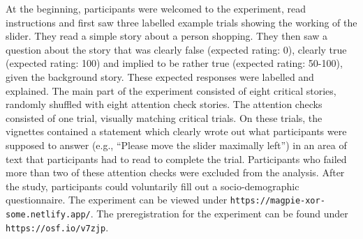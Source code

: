 \documentclass{sp}
\begin{document}
At the beginning, participants were welcomed to the experiment, read instructions and first saw three labelled example trials showing the working of the slider. They read a simple story about a person shopping. They then saw a question about the story that was clearly false (expected rating: 0), clearly true (expected rating: 100) and implied to be rather true (expected rating: 50-100), given the background story. These expected responses were labelled and explained.  
The main part of the experiment consisted of eight critical stories, randomly shuffled with eight attention check stories. The attention checks consisted of one trial, visually matching critical trials. On these trials, the vignettes contained a statement which clearly wrote out what participants were supposed to answer (e.g., ``Please move the slider maximally left'') in an area of text that participants had to read to complete the trial. Participants who failed more than two of these attention checks were excluded from the analysis. 
After the study, participants could voluntarily fill out a socio-demographic questionnaire.
The experiment can be viewed under \texttt{https://magpie-xor-some.netlify.app/}. The preregistration for the experiment can be found under \texttt{https://osf.io/v7zjp}.
\end{document}

